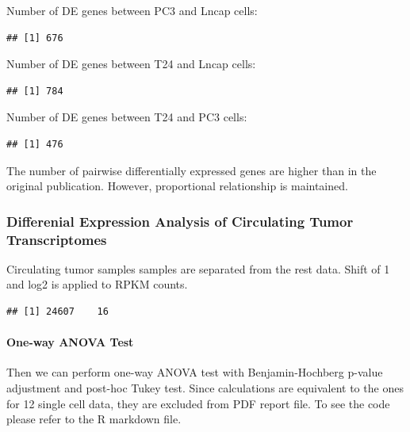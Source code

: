 \documentclass[]{article}
\newenvironment{Shaded}{\begin{snugshade}}{\end{snugshade}}
\newcommand{\KeywordTok}[1]{\textcolor[rgb]{0.13,0.29,0.53}{\textbf{#1}}}
\newcommand{\DataTypeTok}[1]{\textcolor[rgb]{0.13,0.29,0.53}{#1}}
\newcommand{\DecValTok}[1]{\textcolor[rgb]{0.00,0.00,0.81}{#1}}
\newcommand{\OperatorTok}[1]{\textcolor[rgb]{0.81,0.36,0.00}{\textbf{#1}}}
\newcommand{\NormalTok}[1]{#1}
\let\oldparagraph\paragraph
\renewcommand{\paragraph}[1]{\oldparagraph{#1}\mbox{}}
\begin{document}
Number of DE genes between PC3 and Lncap cells:

\begin{verbatim}
## [1] 676
\end{verbatim}

Number of DE genes between T24 and Lncap cells:

\begin{verbatim}
## [1] 784
\end{verbatim}

Number of DE genes between T24 and PC3 cells:

\begin{verbatim}
## [1] 476
\end{verbatim}

The number of pairwise differentially expressed genes are higher than in
the original publication. However, proportional relationship is
maintained.

\subsubsection{Differenial Expression Analysis of Circulating Tumor
Transcriptomes}\label{differenial-expression-analysis-of-circulating-tumor-transcriptomes}

Circulating tumor samples samples are separated from the rest data.
Shift of 1 and log2 is applied to RPKM counts.

\begin{Shaded}
\end{Shaded}

\begin{verbatim}
## [1] 24607    16
\end{verbatim}

\paragraph{One-way ANOVA Test}\label{one-way-anova-test-1}

Then we can perform one-way ANOVA test with Benjamin-Hochberg p-value
adjustment and post-hoc Tukey test. Since calculations are equivalent to
the ones for 12 single cell data, they are excluded from PDF report
file. To see the code please refer to the R markdown file.
\end{document}

